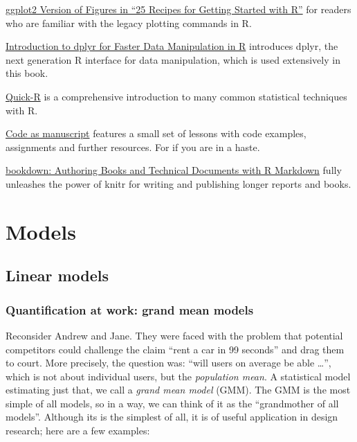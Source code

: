 \documentclass[]{svmono}
\begin{document}
\href{http://www.r-bloggers.com/ggplot2-version-of-figures-in-\%E2\%80\%9C25-recipes-for-getting-started-with-r\%E2\%80\%9D/}{ggplot2
Version of Figures in ``25 Recipes for Getting Started with R''} for
readers who are familiar with the legacy plotting commands in R.

\href{http://rpubs.com/justmarkham/dplyr-tutorial}{Introduction to dplyr
for Faster Data Manipulation in R} introduces dplyr, the next generation
R interface for data manipulation, which is used extensively in this
book.

\href{http://www.statmethods.net/}{Quick-R} is a comprehensive
introduction to many common statistical techniques with R.

\href{http://codeasmanuscript.org/lessons/}{Code as manuscript} features
a small set of lessons with code examples, assignments and further
resources. For if you are in a haste.

\href{https://bookdown.org/yihui/bookdown/}{bookdown: Authoring Books
and Technical Documents with R Markdown} fully unleashes the power of
knitr for writing and publishing longer reports and books.

\part{Models}\label{part-models}

\chapter{Linear models}\label{linear_models}

\section{Quantification at work: grand mean
models}\label{quantification-at-work-grand-mean-models}

Reconsider Andrew and Jane. They were faced with the problem that
potential competitors could challenge the claim ``rent a car in 99
seconds'' and drag them to court. More precisely, the question was:
``will users on average be able \ldots{}'', which is not about
individual users, but the \emph{population mean}. A statistical model
estimating just that, we call a \emph{grand mean model} (GMM). The GMM
is the most simple of all models, so in a way, we can think of it as the
``grandmother of all models''. Although its is the simplest of all, it
is of useful application in design research; here are a few examples:
\end{document}
